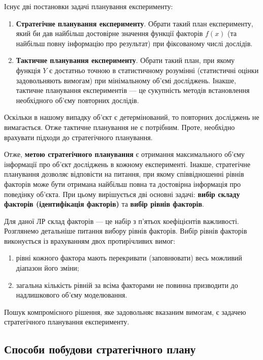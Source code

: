 Існує дві постановки задачі планування експерименту:

\begin{enumerate}
\item \textbf{Стратегічне планування експерименту}. Обрати такий план експерименту, який би дав
  найбільш достовірне значення функції факторів $f(x)$ (та найбільш повну інформацію про результат)
  при фіксованому числі дослідів.
\item \textbf{Тактичне планування експерименту}. Обрати такий план, при якому функція $Y$ є
  достатньо точною в статистичному розумінні (статистичні оцінки задовольняють вимогам) при
  мінімальному об’ємі досліджень. Інакше, тактичне планування експериментів --- це сукупність
  методів встановлення необхідного об’єму повторних дослідів.
\end{enumerate}

Оскільки в нашому випадку об’єкт є детермінований, то повторних досліджень не вимагається. Отже
тактичне планування не є потрібним. Проте, необхідно врахувати підходи до стратегічного планування.

Отже, \textbf{метою стратегічного планування} є отримання максимального об’єму інформації про об’єкт
досліджень в кожному експерименті. Інакше, стратегічне планування дозволяє відповісти на питання,
при якому співвідношенні рівнів факторів може бути отримана найбільш повна та достовірна інформація
про поведінку об’єкта. При цьому вирішується дві основні задачі: \textbf{вибір складу факторів
  (ідентифікація факторів)} та \textbf{вибір рівнів факторів}.

Для даної ЛР склад факторів --- це набір з п’ятьох коефіцієнтів важливості.  Розглянемо детальніше
питання вибору рівнів факторів. Вибір рівнів факторів виконується із врахуванням двох протирічливих
вимог:
\begin{enumerate}
\item рівні кожного фактора мають перекривати (заповнювати) весь можливий діапазон його зміни;
\item загальна кількість рівній за всіма факторами не повинна призводити до надлишкового об’єму
  моделювання.
\end{enumerate}

Пошук компромісного рішення, яке задовольняє вказаним вимогам, є задачею стратегічного планування
експерименту.

\subsection{Способи побудови стратегічного плану}

